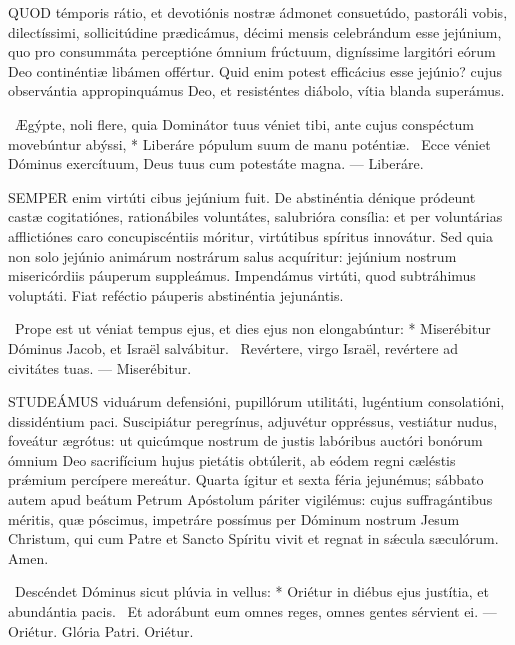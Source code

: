 



\lettrine[lines=2]{Q}{UOD} témporis rátio, et devotiónis nostræ ádmonet consuetúdo, pastoráli vobis, dilectíssimi, sollicitúdine prædicámus, décimi mensis celebrándum esse jejúnium, quo pro consummáta perceptióne ómnium frúctuum, digníssime largitóri eórum Deo continéntiæ libámen offértur. Quid enim potest efficácius esse jejúnio? cujus observántia appropinquámus Deo, et resisténtes diábolo, vítia blanda superámus.

\R\ Ægýpte, noli flere, quia Dominátor tuus véniet tibi, ante cujus conspéctum movebúntur abýssi, * Liberáre pópulum suum de manu poténtiæ. \V\ Ecce véniet Dóminus exercítuum, Deus tuus cum potestáte magna. --- Liberáre.


\lettrine[lines=2]{S}{EMPER} enim virtúti cibus jejúnium fuit. De abstinéntia dénique pródeunt castæ cogitatiónes, rationábiles voluntátes, salubrióra consília: et per voluntárias afflictiónes caro concupiscéntiis móritur, virtútibus spíritus innovátur. Sed quia non solo jejúnio animárum nostrárum salus acquíritur: jejúnium nostrum misericórdiis páuperum suppleámus. Impendámus virtúti, quod subtráhimus voluptáti. Fiat reféctio páuperis abstinéntia jejunántis.

\R\ Prope est ut véniat tempus ejus, et dies ejus non elongabúntur: * Miserébitur Dóminus Jacob, et Israël salvábitur. \V\ Revértere, virgo Israël, revértere ad civitátes tuas. --- Miserébitur.


\lettrine[lines=2]{S}{TUDEÁMUS} viduárum defensióni, pupillórum utilitáti, lugéntium consolatióni, dissidéntium paci. Suscipiátur peregrínus, adjuvétur oppréssus, vestiátur nudus, foveátur ægrótus: ut quicúmque nostrum de justis labóribus auctóri bonórum ómnium Deo sacrifícium hujus pietátis obtúlerit, ab eódem regni cæléstis prǽmium percípere mereátur. Quarta ígitur et sexta féria jejunémus; sábbato autem apud beátum Petrum Apóstolum páriter vigilémus: cujus suffragántibus méritis, quæ póscimus, impetráre possímus per Dóminum nostrum Jesum Christum, qui cum Patre et Sancto Spíritu vivit et regnat in sǽcula sæculórum. Amen.

\R\ Descéndet Dóminus sicut plúvia in vellus: * Oriétur in diébus ejus justítia, et abundántia pacis. \V\ Et adorábunt eum omnes reges, omnes gentes sérvient ei. --- Oriétur. Glória Patri. Oriétur.

